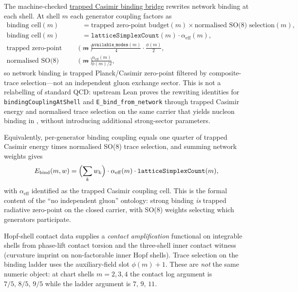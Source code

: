 \documentclass[11pt]{amsart}
\newcommand{\leanterm}[2]{\hyperref[#1]{#2}}
\begin{document}
The machine-checked \leanterm{lean:trapped-casimir-bridge}{trapped Casimir binding
bridge} rewrites network binding at each shell. At shell $m$ each generator coupling
factors as
\begin{align*}
\text{binding cell}(m)
&=\text{trapped zero-point budget}(m)\times\text{normalised SO(8) selection}(m),\\
\text{binding cell}(m)
&=\texttt{latticeSimplexCount}(m)\cdot\alpha_{\mathrm{eff}}(m),\\
\text{trapped zero-point budget}(m)
&=\frac{\texttt{available\_modes}(m)}{4}\cdot\frac{\phi(m)}{2},\\
\text{normalised SO(8) selection}(m)
&=\frac{\alpha_{\mathrm{eff}}(m)}{\phi(m)/2},
\end{align*}
so network binding is trapped Planck/Casimir zero-point filtered by composite-trace
selection---not an independent gluon exchange sector.
This is not a relabelling of standard QCD: upstream Lean proves the rewriting
identities for \texttt{bindingCouplingAtShell} and \texttt{E\_bind\_from\_network}
through trapped Casimir energy and normalised trace selection on the same carrier
that yields nucleon binding in \cite{hqiv-nucleon-binding-paper}, without
introducing additional strong-sector parameters.

Equivalently, per-generator binding coupling equals one quarter of trapped Casimir
energy times normalised SO(8) trace selection, and summing network weights gives
\[
E_{\mathrm{bind}}(m,w)=\Bigl(\sum_k w_k\Bigr)\cdot\alpha_{\mathrm{eff}}(m)
\cdot\texttt{latticeSimplexCount}(m),
\]
with $\alpha_{\mathrm{eff}}$ identified as the trapped Casimir coupling cell. This
is the formal content of the ``no independent gluon'' ontology:
strong binding \emph{is} trapped radiative zero-point on the closed carrier, with
SO(8) weights selecting which generators participate.

Hopf-shell contact data supplies a \emph{contact amplification} functional on
integrable shells from phase-lift contact torsion and the three-shell inner contact
witness (curvature imprint on non-factorable inner Hopf shells). Trace selection on the binding
ladder uses the auxiliary-field slot $\phi(m)+1$. These are \emph{not} the same
numeric object: at chart shells $m=2,3,4$ the contact log argument is
$7/5,\,8/5,\,9/5$ while the ladder argument is $7,\,9,\,11$.
\end{document}
